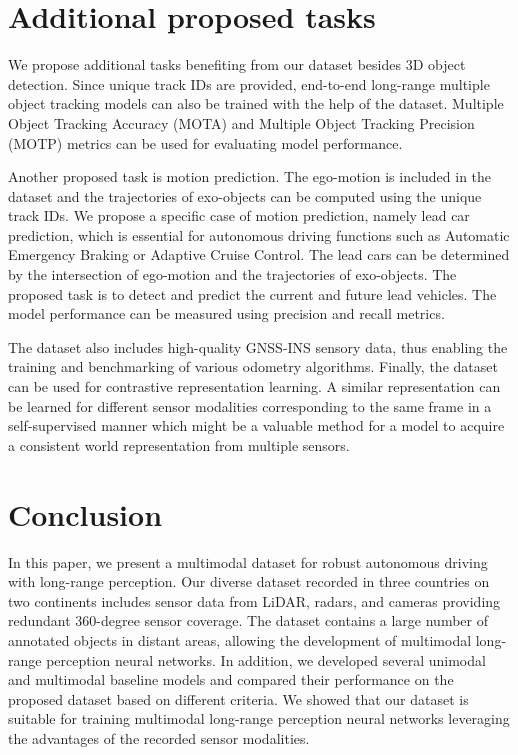 \documentclass{article}
\begin{document}
\section{Additional proposed tasks}
We propose additional tasks benefiting from our dataset besides 3D object detection. Since unique track IDs are provided, end-to-end long-range multiple object tracking models can also be trained with the help of the dataset. Multiple Object Tracking Accuracy (MOTA) and Multiple Object Tracking Precision (MOTP) metrics can be used for evaluating model performance.

Another proposed task is motion prediction. The ego-motion is included in the dataset and the trajectories of exo-objects can be computed using the unique track IDs. We propose a specific case of motion prediction, namely lead car prediction, which is essential for autonomous driving functions such as Automatic Emergency Braking or Adaptive Cruise Control. The lead cars can be determined by the intersection of ego-motion and the trajectories of exo-objects. The proposed task is to detect and predict the current and future lead vehicles. The model performance can be measured using precision and recall metrics.

The dataset also includes high-quality GNSS-INS sensory data, thus enabling the training and benchmarking of various odometry algorithms. Finally, the dataset can be used for contrastive representation learning. A similar representation can be learned for different sensor modalities corresponding to the same frame in a self-supervised manner which might be a valuable method for a model to acquire a consistent world representation from multiple sensors.


\section{Conclusion}
\label{sec:conclusion}
In this paper, we present a multimodal dataset for robust autonomous driving with long-range perception. Our diverse dataset recorded in three countries on two continents includes sensor data from LiDAR, radars, and cameras providing redundant 360-degree sensor coverage. The dataset contains a large number of annotated objects in distant areas, allowing the development of multimodal long-range perception neural networks. In addition, we developed several unimodal and multimodal baseline models and compared their performance on the proposed dataset based on different criteria. We showed that our dataset is suitable for training multimodal long-range perception neural networks leveraging the advantages of the recorded sensor modalities. 
\end{document}
